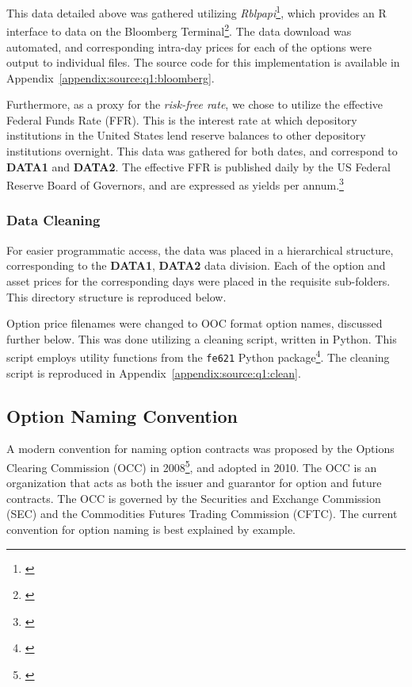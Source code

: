 \documentclass[10pt]{article}
\begin{document}
    This data detailed above was gathered utilizing \textit{Rblpapi}\footnote{\cite{Armstrong2018}}, which provides an R interface to data on the Bloomberg Terminal\footnote{\cite{BloombergL.P.2019}}. The data download was automated, and corresponding intra-day prices for each of the options were output to individual files. The source code for this implementation is available in Appendix~\ref{appendix:source:q1:bloomberg}.

    Furthermore, as a proxy for the \textit{risk-free rate}, we chose to utilize the effective Federal Funds Rate (FFR). This is the interest rate at which depository institutions in the United States lend reserve balances to other depository institutions overnight. This data was gathered for both dates, and correspond to \textbf{DATA1} and \textbf{DATA2}. The effective FFR is published daily by the US Federal Reserve Board of Governors, and are expressed as yields per annum.\footnote{\cite{BoardofGovernorsoftheFederalReserveSystem2019}}

        \subsubsection{Data Cleaning}

            For easier programmatic access, the data was placed in a hierarchical structure, corresponding to the \textbf{DATA1}, \textbf{DATA2} data division. Each of the option and asset prices for the corresponding days were placed in the requisite sub-folders. This directory structure is reproduced below.


            Option price filenames were changed to OOC format option names, discussed further below. This was done utilizing a cleaning script, written in Python. This script employs utility functions from the \texttt{fe621} Python package\footnote{\cite{Weerawarana2019}}. The cleaning script is reproduced in Appendix~\ref{appendix:source:q1:clean}.
    
        \subsection{Option Naming Convention}

        A modern convention for naming option contracts was proposed by the Options Clearing Commission (OCC) in 2008\footnote{\cite{OptionsSymbologyInitiative2008}}, and adopted in 2010. The OCC is an organization that acts as both the issuer and guarantor for option and future contracts. The OCC is governed by the Securities and Exchange Commission (SEC) and the Commodities Futures Trading Commission (CFTC). The current convention for option naming is best explained by example.
        
\end{document}
